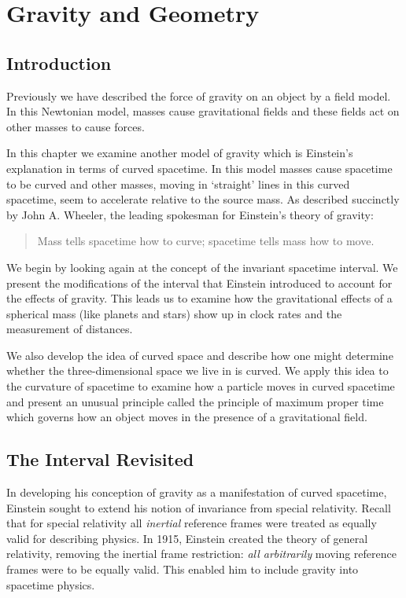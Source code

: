 \chapter{Gravity and Geometry}
\label{chapter:gravity}

\section{Introduction}

Previously we have described the force of gravity on an object by a
field model.  In this Newtonian model, masses cause gravitational fields and
these fields act on other masses to cause forces.
    
In this chapter we examine another model of gravity which is
Einstein's explanation in terms of curved spacetime.  In this model
masses cause spacetime to be curved and other masses, moving in
`straight' lines in this curved spacetime, seem to accelerate relative
to the source mass.  As described succinctly by John A. Wheeler,
the leading spokesman for Einstein's theory of gravity: 

\begin{quote}
Mass tells spacetime how to curve;  spacetime tells mass how to
move.
\end{quote}

We begin by looking again at the concept of the invariant spacetime
interval.  We present the modifications of the interval that Einstein
introduced to account for the effects of gravity.  This leads us to
examine how the gravitational effects of a spherical mass (like
planets and stars) show up in clock rates and the measurement of
distances.
    
We also develop the idea of curved space and describe how one might
determine whether the three-dimensional space we live in is curved.
We apply this idea to the curvature of spacetime to examine how a
particle moves in curved spacetime and present an unusual principle
called the principle of maximum proper time which governs how an
object moves in the presence of a gravitational field.

\section{The Interval Revisited}

In developing his conception of gravity as a manifestation of curved
spacetime, Einstein sought to extend his notion of invariance from
special relativity.  Recall that for special relativity all
\textit{inertial} reference frames were treated as equally valid for
describing physics.  In 1915, Einstein created the theory of general
relativity, removing the inertial frame restriction: \textit{all
  arbitrarily} moving reference frames were to be equally valid.  This
enabled him to include gravity into spacetime physics.

